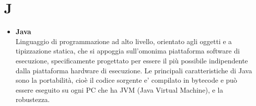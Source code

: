 \chapter{J} \label{J}
\begin{itemize}
	\item \textbf{Java} \\
	 Linguaggio di programmazione ad alto livello, orientato agli oggetti e a tipizzazione statica, che si appoggia sull'omonima piattaforma software di esecuzione, specificamente progettato per essere il più possibile indipendente dalla piattaforma hardware di esecuzione. Le principali caratteristiche di Java sono la portabilità, cioè il codice sorgente e' compilato in bytecode e può essere eseguito su ogni PC che ha JVM (Java Virtual Machine), e la robustezza. 
\end{itemize}
